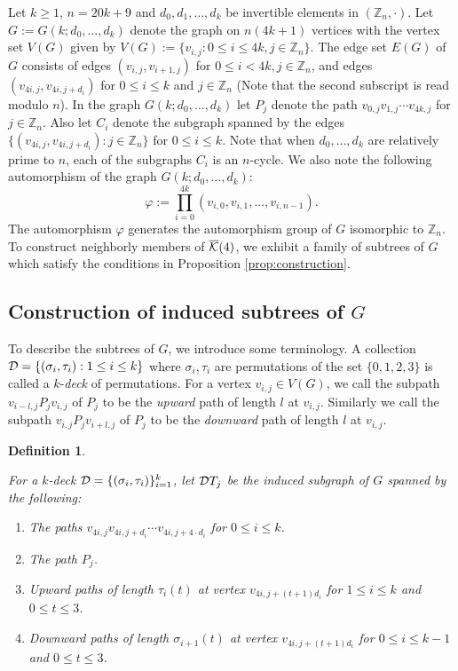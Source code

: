 \documentclass[11pt]{article}
\newtheorem{defn}{{\bf Definition}}[section]
\newcommand{\mb}{\mathbb}
\newcommand{\tr}[1]{{\cal D}T_#1}
\begin{document}
Let $k\geq 1$, $n = 20k+9$ and $d_0,d_1,\ldots, d_k$ be invertible elements
in $(\mathbb{Z}_n,\cdot)$.  Let $G := G(k;d_0,\ldots,d_k)$ denote the graph
on $n(4k+1)$ vertices with the vertex set $V(G)$ given by 
$V(G) := \{v_{i,j}: 0\leq i\leq 4k, j\in \mb{Z}_n\}$. The edge set $E(G)$ of
$G$ consists of edges $(v_{i,j},v_{i+1,j})$ for $0\leq i<4k, j\in \mb{Z}_n$,
and edges $(v_{4i,j},v_{4i,j+d_i})$ for $0\leq i\leq k$ and $j\in
\mathbb{Z}_n$ (Note that the second
subscript is read modulo $n$). In the graph $G(k;d_0,\ldots,d_k)$ let $P_j$
denote the path $v_{0,j}v_{1,j}\cdots v_{4k,j}$ for $j\in \mb{Z}_n$. Also let
$C_i$ denote the subgraph spanned by the edges $\{(v_{4i,j},v_{4i,j+d_i}):
j\in \mathbb{Z}_n\}$
for $0\leq i\leq k$. Note that when $d_0,\ldots,d_k$ are relatively prime to
$n$, each of the subgraphs $C_i$ is an $n$-cycle. We also note the following
automorphism of the graph $G(k;d_0,\ldots,d_k)$:
\begin{equation}\label{eq:auto}
\varphi := \prod_{i=0}^{4k} (v_{i,0},v_{i,1},\ldots,v_{i,n-1}).
\end{equation}
The automorphism $\varphi$ generates the automorphism group of $G$
isomorphic to $\mathbb{Z}_n$. To construct neighborly members of
$\overline{\cal K}(4)$, we exhibit a family of subtrees of $G$ which
satisfy the conditions in Proposition \ref{prop:construction}. 

\subsection{Construction of induced subtrees of $G$}
To describe the subtrees of $G$, we introduce some terminology. A
collection ${\cal D}=\{(\sigma_i,\tau_i):1\leq i\leq k\}$ where
$\sigma_i,\tau_i$ are permutations of the set $\{0,1,2,3\}$ is called
a $k$-{\em deck} of permutations. For a vertex $v_{i,j}\in V(G)$, we call the
subpath $v_{i-l,j}P_jv_{i,j}$ of $P_j$ to be the {\em upward} path of length $l$ at
$v_{i,j}$. Similarly we call the subpath $v_{i,j}P_jv_{i+l,j}$ of $P_j$ to be the
{\em downward} path of length $l$ at $v_{i,j}$. 

\begin{defn}\label{defn:tree}{\rm 
For a $k$-deck ${\cal D} =
\{(\sigma_i,\tau_i)\}_{i=1}^k$, let $\tr{j}$ be the induced subgraph of
$G$ spanned by the following:
\begin{enumerate}[{\rm (i)}]
\item The paths $v_{4i,j}v_{4i,j+d_i}\cdots v_{4i,j+4\cdot d_i}$ for $0\leq i\leq
k$.
\item The path $P_j$.
\item Upward paths of length $\tau_i(t)$ at vertex $v_{4i,j+(t+1)d_i}$ for
$1\leq i\leq k$ and $0\leq t\leq 3$. 
\item Downward paths of length $\sigma_{i+1}(t)$ at vertex $v_{4i,j+(t+1)d_i}$
for $0\leq i\leq k-1$ and $0\leq t\leq 3$.
\end{enumerate}
}
\end{defn}
\end{document}
